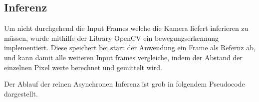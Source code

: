 \subsection*{Inferenz}


Um nicht durchgehend die Input Frames welche die Kamera liefert inferieren zu 
müssen, wurde mithilfe der Library OpenCV ein bewegungserkennung 
implementiert. Diese speichert bei start der Anwendung ein Frame 
als Refernz ab, und kann damit alle weiteren Input frames vergleiche, 
indem der Abstand der einzelnen Pixel werte berechnet und gemittelt wird.

Der Ablauf der reinen Asynchronen Inferenz ist grob in 
folgendem Pseudocode dargestellt. 





        



        






